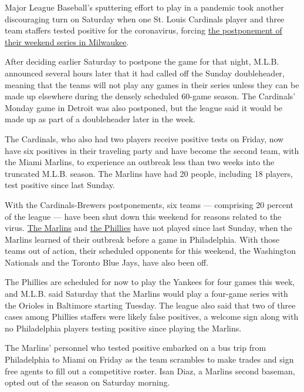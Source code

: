 Major League Baseball's sputtering effort to play in a pandemic took
another discouraging turn on Saturday when one St. Louis Cardinals
player and three team staffers tested positive for the coronavirus,
forcing
\href{https://www.nytimes3xbfgragh.onion/2020/07/31/sports/baseball/cardinals-twins-coronavirus-mlb.html}{the
postponement of their weekend series in Milwaukee}.

After deciding earlier Saturday to postpone the game for that night,
M.L.B. announced several hours later that it had called off the Sunday
doubleheader, meaning that the teams will not play any games in their
series unless they can be made up elsewhere during the densely scheduled
60-game season. The Cardinals' Monday game in Detroit was also
postponed, but the league said it would be made up as part of a
doubleheader later in the week.

The Cardinals, who also had two players receive positive tests on
Friday, now have six positives in their traveling party and have become
the second team, with the Miami Marlins, to experience an outbreak less
than two weeks into the truncated M.L.B. season. The Marlins have had 20
people, including 18 players, test positive since last Sunday.

With the Cardinals-Brewers postponements, six teams --- comprising 20
percent of the league --- have been shut down this weekend for reasons
related to the virus.
\href{https://www.nytimes3xbfgragh.onion/2020/07/28/sports/baseball/marlins-outbreak-mlb-coronavirus.html}{The
Marlins} and
\href{https://www.nytimes3xbfgragh.onion/2020/07/30/sports/baseball/phillies-blue-jays-postponed-coronavirus.html}{the
Phillies} have not played since last Sunday, when the Marlins learned of
their outbreak before a game in Philadelphia. With those teams out of
action, their scheduled opponents for this weekend, the Washington
Nationals and the Toronto Blue Jays, have also been off.

The Phillies are scheduled for now to play the Yankees for four games
this week, and M.L.B. said Saturday that the Marlins would play a
four-game series with the Orioles in Baltimore starting Tuesday. The
league also said that two of three cases among Phillies staffers were
likely false positives, a welcome sign along with no Philadelphia
players testing positive since playing the Marlins.

The Marlins' personnel who tested positive embarked on a bus trip from
Philadelphia to Miami on Friday as the team scrambles to make trades and
sign free agents to fill out a competitive roster. Isan Diaz, a Marlins
second baseman, opted out of the season on Saturday morning.

